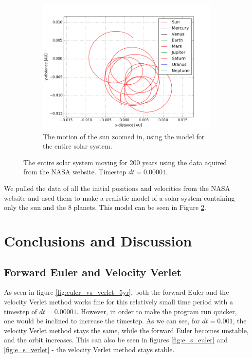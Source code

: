 \documentclass[10pt,showpacs,preprintnumbers,footinbib,amsmath,amssymb,aps,prl,twocolumn,groupedaddress,superscriptaddress,showkeys]{revtex4-1}
\begin{document}
\begin{figure}
	
    \begin{subfigure}[b]{0.4\textwidth}
		\includegraphics[width = \linewidth]{sun_complete}
		\caption{The motion of the sun zoomed in, using the model for the entire solar system.}
		\label{fig:system_all_b}
	\end{subfigure}
	
	\caption{The entire solar system moving for 200 years using the data aquired from the NASA website. Timestep $dt = 0.00001$.}
    \label{fig:system_all}
\end{figure}
We pulled the data of all the initial positions and velocities from the NASA website and used them to make a realistic model of a solar system containing only the sun and the 8 planets. This model can be seen in Figure \ref{fig:system_all}. 


\section{Conclusions and Discussion}

\subsection{Forward Euler and Velocity Verlet}

As seen in figure \ref{fig:euler_vs_verlet_5yr}, both the forward Euler and the velocity Verlet method works fine for this relatively small time period with a timestep of $dt = 0.00001$. However, in order to make the program run quicker, one would be inclined to increase the timestep. As we can see, for $dt = 0.001$, the velocity Verlet method stays the same, while the forward Euler becomes unstable, and the orbit increases. This can also be seen in figures \ref{fig:e_s_euler} and \ref{fig:e_s_verlet} - the velocity Verlet method stays stable.
\end{document}
